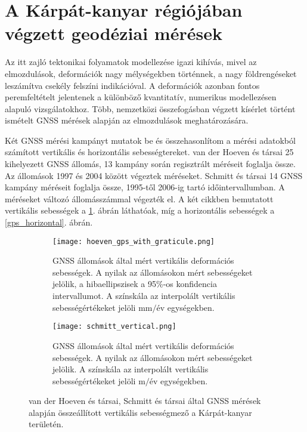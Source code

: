 \documentclass[12pt]{report}
\numberwithin{equation}{section}
\numberwithin{table}{section}
\numberwithin{figure}{section}
\begin{document}
\section{A Kárpát-kanyar régiójában végzett geodéziai mérések}\label{GNSS}

Az itt zajló tektonikai folyamatok modellezése igazi kihívás, mivel az elmozdulások, deformációk nagy mélységekben történnek, a nagy földrengéseket leszámítva csekély felszíni indikációval. A deformációk azonban fontos peremfeltételt jelentenek a különböző kvantitatív, numerikus modellezésen alapuló vizsgálatokhoz. Több, nemzetközi összefogásban végzett kísérlet történt ismételt GNSS mérések alapján az elmozdulások meghatározására.

Két GNSS mérési kampányt mutatok be és összehasonlítom a mérési adatokból számított vertikális és horizontális sebességtereket. van der Hoeven és társai \cite{Hoeven2005} 25 kihelyezett GNSS állomás, 13 kampány során regisztrált méréseit foglalja össze. Az állomások 1997 és 2004 között végeztek méréseket. Schmitt és társai \cite{Schmitt2007} 14 GNSS kampány méréseit foglalja össze, 1995-től 2006-ig tartó időintervallumban. A méréseket változó állomásszámmal végezték el. A két cikkben \cite{Hoeven2005, Schmitt2007} bemutatott vertikális sebességek a \ref{gps_vertical}. ábrán láthatóak, míg a horizontális sebességek a \ref{gps_horizontal}. ábrán.

\begin{center}
    \begin{figure}[H]
        \begin{subfigure}[t]{.40\linewidth}
            \centering
            \texttt{[image: hoeven\_gps\_with\_graticule.png]}
            \caption{GNSS állomások által mért vertikális deformációs sebességek. A nyilak az állomásokon mért sebességeket jelölik, a hibaellipszisek a 95\%-os konfidencia intervallumot. A színskála az interpolált vertikális sebességértékeket jelöli $\text{mm}/\text{év}$ egységekben. \cite{Hoeven2005}}
        \end{subfigure}
        \hspace{25pt}
        \begin{subfigure}[t]{.40\linewidth}
            \centering
            \texttt{[image: schmitt\_vertical.png]}
            \caption{GNSS állomások által mért vertikális deformációs sebességek. A nyilak az állomásokon mért sebességeket jelölik. A színskála az interpolált vertikális sebességértékeket jelöli $\text{m}/\text{év}$ egységekben. \cite{Schmitt2007}}
        \end{subfigure}
        \caption{van der Hoeven és társai, Schmitt és társai \cite{Hoeven2005, Schmitt2007} által GNSS mérések alapján összeállított vertikális sebességmező a Kárpát-kanyar területén.}\label{gps_vertical}
    \end{figure}
\end{center}
\end{document}
